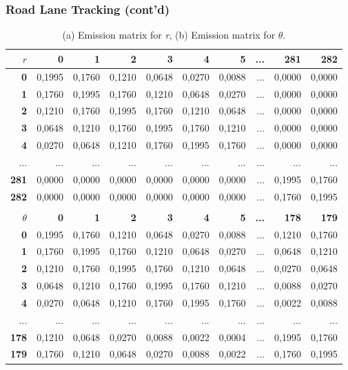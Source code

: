 \documentclass{beamer}
\begin{document}
\frame
{
	\frametitle{Road Lane Tracking (cont'd)} 
	\begin{table}
	\caption{(a) Emission matrix for \textit{r}, (b) Emission matrix for \textit{$\theta $}.}
	\centering
	{\tiny
	\begin{tabular}{|r|r|r|r|r|r|r|r|r|r|}
	\hline
	{\bf {\normalsize $r$}} & {\bf 0} & {\bf 1} & {\bf 2} & {\bf 3} & {\bf 4} & {\bf 5} & {\bf ...} & {\bf 281} & {\bf 282} \\
	\hline
	{\bf 0} & 0,1995 & 0,1760 & 0,1210 & 0,0648 & 0,0270 & 0,0088 & ... & 0,0000 & 0,0000 \\
	\hline
	{\bf 1} & 0,1760 & 0,1995 & 0,1760 & 0,1210 & 0,0648 & 0,0270 & ... & 0,0000 & 0,0000 \\
	\hline
	{\bf 2} & 0,1210 & 0,1760 & 0,1995 & 0,1760 & 0,1210 & 0,0648 & ... & 0,0000 & 0,0000 \\
	\hline
	{\bf 3} & 0,0648 & 0,1210 & 0,1760 & 0,1995 & 0,1760 & 0,1210 & ... & 0,0000 & 0,0000 \\
	\hline
	{\bf 4} & 0,0270 & 0,0648 & 0,1210 & 0,1760 & 0,1995 & 0,1760 & ... & 0,0000 & 0,0000 \\
	\hline
	... & ... & ... & ... & ... & ... & ... & ... & ... & ... \\
	\hline
	{\bf 281} & 0,0000 & 0,0000 & 0,0000 & 0,0000 & 0,0000 & 0,0000 & ... & 0,1995 & 0,1760 \\
	\hline
	{\bf 282} & 0,0000 & 0,0000 & 0,0000 & 0,0000 & 0,0000 & 0,0000 & ... & 0,1760 & 0,1995 \\
	\hline
	\multicolumn{10}{c}{} \\
	\hline
	{\bf {\normalsize $\theta$}} & {\bf 0} & {\bf 1} & {\bf 2} & {\bf 3} & {\bf 4} & {\bf 5} & {\bf ...} & {\bf 178} & {\bf 179} \\
	\hline
	{\bf 0} & 0,1995 & 0,1760 & 0,1210 & 0,0648 & 0,0270 & 0,0088 & ... & 0,1210 & 0,1760 \\
	\hline
	{\bf 1} & 0,1760 & 0,1995 & 0,1760 & 0,1210 & 0,0648 & 0,0270 & ... & 0,0648 & 0,1210 \\
	\hline
	{\bf 2} & 0,1210 & 0,1760 & 0,1995 & 0,1760 & 0,1210 & 0,0648 & ... & 0,0270 & 0,0648 \\
	\hline
	{\bf 3} & 0,0648 & 0,1210 & 0,1760 & 0,1995 & 0,1760 & 0,1210 & ... & 0,0088 & 0,0270 \\
	\hline
	{\bf 4} & 0,0270 & 0,0648 & 0,1210 & 0,1760 & 0,1995 & 0,1760 & ... & 0,0022 & 0,0088 \\
	\hline
	... & ... & ... & ... & ... & ... & ... & ... & ... & ... \\
	\hline
	{\bf 178} & 0,1210 & 0,0648 & 0,0270 & 0,0088 & 0,0022 & 0,0004 & ... & 0,1995 & 0,1760 \\
	\hline
	{\bf 179} & 0,1760 & 0,1210 & 0,0648 & 0,0270 & 0,0088 & 0,0022 & ... & 0,1760 & 0,1995 \\
	\hline
	\end{tabular} 
	} 
	\label{tab:ldtable4}
	\end{table}
}
\end{document}
